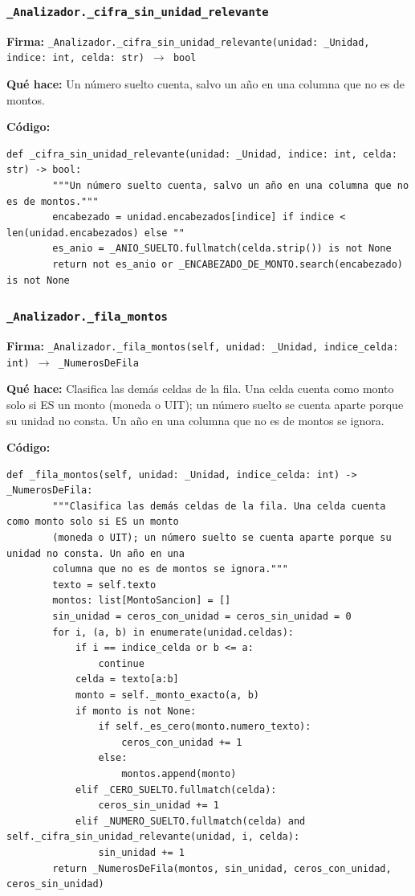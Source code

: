 \documentclass[11pt,a4paper]{article}
\begin{document}
\subsubsection*{\texttt{\_Analizador.\_cifra\_sin\_unidad\_relevante}}
\textbf{Firma:} \texttt{\_Analizador.\_cifra\_sin\_unidad\_relevante(unidad: \_Unidad, indice: int, celda: str) $\rightarrow$ bool}

\textbf{Qué hace:} Un número suelto cuenta, salvo un año en una columna que no es de montos.

\textbf{Código:}
\begin{lstlisting}
def _cifra_sin_unidad_relevante(unidad: _Unidad, indice: int, celda: str) -> bool:
        """Un número suelto cuenta, salvo un año en una columna que no es de montos."""
        encabezado = unidad.encabezados[indice] if indice < len(unidad.encabezados) else ""
        es_anio = _ANIO_SUELTO.fullmatch(celda.strip()) is not None
        return not es_anio or _ENCABEZADO_DE_MONTO.search(encabezado) is not None
\end{lstlisting}

\subsubsection*{\texttt{\_Analizador.\_fila\_montos}}
\textbf{Firma:} \texttt{\_Analizador.\_fila\_montos(self, unidad: \_Unidad, indice\_celda: int) $\rightarrow$ \_NumerosDeFila}

\textbf{Qué hace:} Clasifica las demás celdas de la fila. Una celda cuenta como monto solo si ES un monto
(moneda o UIT); un número suelto se cuenta aparte porque su unidad no consta. Un año en una
columna que no es de montos se ignora.

\textbf{Código:}
\begin{lstlisting}
def _fila_montos(self, unidad: _Unidad, indice_celda: int) -> _NumerosDeFila:
        """Clasifica las demás celdas de la fila. Una celda cuenta como monto solo si ES un monto
        (moneda o UIT); un número suelto se cuenta aparte porque su unidad no consta. Un año en una
        columna que no es de montos se ignora."""
        texto = self.texto
        montos: list[MontoSancion] = []
        sin_unidad = ceros_con_unidad = ceros_sin_unidad = 0
        for i, (a, b) in enumerate(unidad.celdas):
            if i == indice_celda or b <= a:
                continue
            celda = texto[a:b]
            monto = self._monto_exacto(a, b)
            if monto is not None:
                if self._es_cero(monto.numero_texto):
                    ceros_con_unidad += 1
                else:
                    montos.append(monto)
            elif _CERO_SUELTO.fullmatch(celda):
                ceros_sin_unidad += 1
            elif _NUMERO_SUELTO.fullmatch(celda) and self._cifra_sin_unidad_relevante(unidad, i, celda):
                sin_unidad += 1
        return _NumerosDeFila(montos, sin_unidad, ceros_con_unidad, ceros_sin_unidad)
\end{lstlisting}
\end{document}
